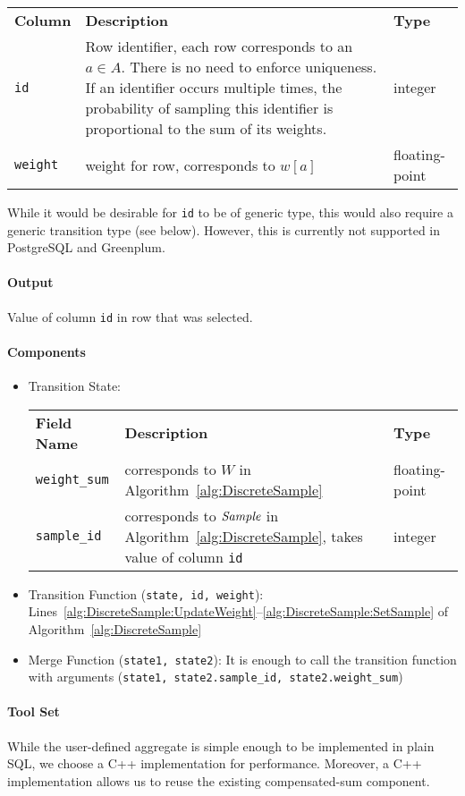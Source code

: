 \begin{center}
	\begin{tabularx}{\linewidth}{lXl}
		\toprule%
		\textbf{Column} & \textbf{Description} & \textbf{Type}
		\\\otoprule
		\texttt{id} &
		Row identifier, each row corresponds to an $a \in A$. There is no need to enforce uniqueness. If an identifier occurs multiple times, the probability of sampling this identifier is proportional to the sum of its weights. &
		integer
		\\\midrule
		\texttt{weight} &
		weight for row, corresponds to $w[a]$ &
		floating-point
		\\\bottomrule
	\end{tabularx}
\end{center}
%
While it would be desirable for \texttt{id} to be of generic type, this would also require a generic transition type (see below). However, this is currently not supported in PostgreSQL and Greenplum.

\paragraph{Output}

Value of column \texttt{id} in row that was selected.

\paragraph{Components}

\begin{itemize}
	\item Transition State:
		\begin{center}
			\begin{tabularx}{\linewidth}{lXl}
				\toprule%
				\textbf{Field Name} & \textbf{Description} & \textbf{Type}
				\\\otoprule
				\texttt{weight\_sum} &
				corresponds to $W$ in Algorithm~\ref{alg:DiscreteSample} &
				floating-point
				\\\midrule
				\texttt{sample\_id} &
				corresponds to $\mathit{Sample}$ in Algorithm~\ref{alg:DiscreteSample}, takes value of column \texttt{id} &
				integer
				\\\bottomrule
			\end{tabularx}
		\end{center}
	\item Transition Function (\texttt{state, id, weight}): Lines~\ref{alg:DiscreteSample:UpdateWeight}--\ref{alg:DiscreteSample:SetSample} of Algorithm~\ref{alg:DiscreteSample}
	\item Merge Function (\texttt{state1, state2}): It is enough to call the transition function with arguments (\texttt{state1, state2.sample\_id, state2.weight\_sum})
\end{itemize}

\paragraph{Tool Set}

While the user-defined aggregate is simple enough to be implemented in plain SQL, we choose a C++ implementation for performance. Moreover, a C++ implementation allows us to reuse the existing compensated-sum component. 
